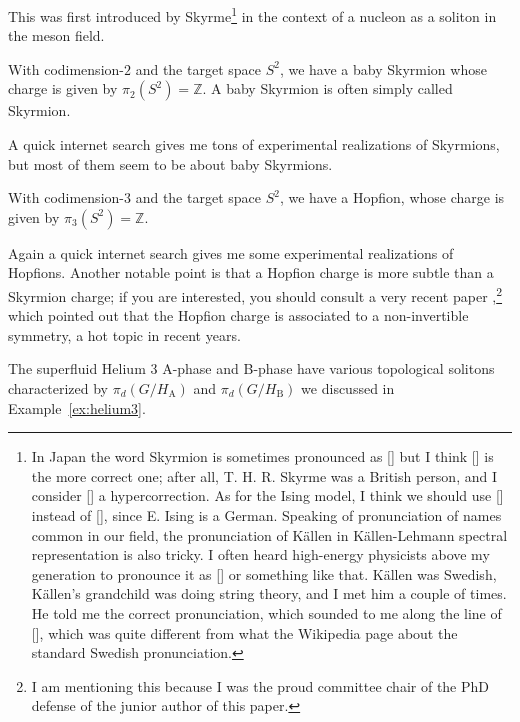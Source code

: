 \documentclass[12pt]{article}
\numberwithin{equation}{section}
\def\bZ{\mathbb{Z}}
\begin{document}
This was first introduced by Skyrme\footnote{%
In Japan the word Skyrmion is sometimes pronounced as [] but I think [] is the more correct one;
after all, T. H. R. Skyrme was a British person, and I consider [] a hypercorrection.
As for the Ising model, I think we should use [] instead of [],
since E. Ising is a German.
Speaking of pronunciation of names common in our field, 
the pronunciation of K\"allen in K\"allen-Lehmann spectral representation is also tricky.
I often heard high-energy physicists above my generation to pronounce it as [] or something like that.
K\"allen was Swedish,
K\"allen's grandchild was doing string theory, and I met him a couple of times.
He told me the correct pronunciation, which sounded to me  along the line of [],
which was quite different from what the Wikipedia page about the standard Swedish pronunciation.
} \cite{Skyrme:1961vq,Skyrme:1962vh} in the context of a nucleon as a soliton in the meson field.

\begin{example}
With codimension-$2$ and the target space $S^2$, we have a baby Skyrmion whose charge is given by $\pi_2(S^2)=\bZ$.
A baby Skyrmion is often simply called  Skyrmion.
\end{example}

A quick internet search gives me tons of experimental realizations of Skyrmions, 
but most of them seem to be about baby Skyrmions. 

\begin{example}
With codimension-$3$ and the target space $S^2$, we have a Hopfion, whose charge is given by $\pi_3(S^2)=\bZ$.
\end{example}

Again a quick internet search gives me some experimental realizations of Hopfions.
Another notable point is that a Hopfion charge is more subtle than a Skyrmion charge;
if you are interested, you should consult a very recent paper \cite{Chen:2022cyw},\footnote{%
I am mentioning this because I was the proud committee chair of the PhD defense of the junior author of this paper.
}
which pointed out that the Hopfion charge is associated to a non-invertible symmetry,
a hot topic in recent years.



\begin{example}
The superfluid Helium 3 A-phase and B-phase have various topological solitons characterized by $\pi_d(G/H_\text{A})$
and $\pi_d(G/H_\text{B})$ we discussed in Example~\ref{ex:helium3}.
\end{example}
\end{document}
